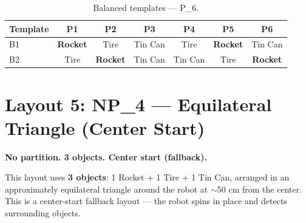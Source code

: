 \documentclass[a4]{article}
\begin{document}
\begin{table}[H]
\centering
\begin{tabular}{lcccccc}
\toprule
\textbf{Template} & \textbf{P1} & \textbf{P2} & \textbf{P3} & \textbf{P4} & \textbf{P5} & \textbf{P6} \\
\midrule
B1 & \textbf{Rocket} & Tire & Tin Can & Tire & \textbf{Rocket} & Tin Can \\
B2 & Tire & \textbf{Rocket} & Tin Can & Tin Can & Tire & \textbf{Rocket} \\
\bottomrule
\end{tabular}
\caption{Balanced templates --- P\_6.}
\end{table}

\pagebreak
\section*{Layout 5: NP\_4 --- Equilateral Triangle (Center Start)}

\textbf{No partition. 3 objects. Center start (fallback).}

This layout uses \textbf{3 objects}: 1 Rocket + 1 Tire + 1 Tin Can, arranged in an approximately equilateral triangle around the robot at $\sim$50 cm from the center. This is a center-start fallback layout --- the robot spins in place and detects surrounding objects.
\end{document}
